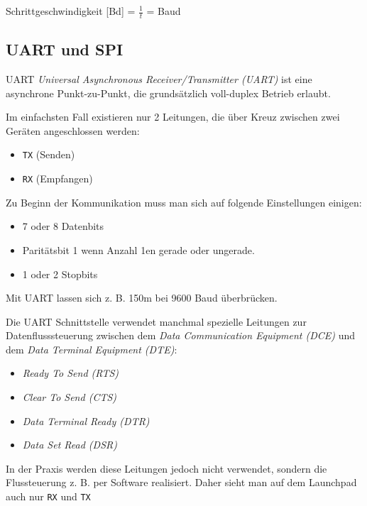 \begin{defi}{Schrittgeschwindigkeit}
    [Bd] = $\frac{1}{t}$ = Baud
\end{defi}

\subsection{UART und SPI}

\begin{defi}{UART}
    \emph{Universal Asynchronous Receiver/Transmitter (UART)} ist eine asynchrone Punkt-zu-Punkt, die grundsätzlich voll-duplex Betrieb erlaubt.

    Im einfachsten Fall existieren nur 2 Leitungen, die über Kreuz zwischen zwei Geräten angeschlossen werden:
    \begin{itemize}
        \item \texttt{TX} (Senden)
        \item \texttt{RX} (Empfangen)
    \end{itemize}

    Zu Beginn der Kommunikation muss man sich auf folgende Einstellungen einigen:
    \begin{itemize}
        \item 7 oder 8 Datenbits
        \item Paritätsbit 1 wenn Anzahl 1en gerade oder ungerade.
        \item 1 oder 2 Stopbits
    \end{itemize}

    Mit UART lassen sich z. B. 150m bei 9600 Baud überbrücken.

    Die UART Schnittstelle verwendet manchmal spezielle Leitungen zur Datenflusssteuerung zwischen dem \emph{Data Communication Equipment (DCE)} und dem \emph{Data Terminal Equipment (DTE)}:
    \begin{itemize}
        \item \emph{Ready To Send (RTS)}
        \item \emph{Clear To Send (CTS)}
        \item \emph{Data Terminal Ready (DTR)}
        \item \emph{Data Set Read (DSR)}
    \end{itemize}

    In der Praxis werden diese Leitungen jedoch nicht verwendet, sondern die Flussteuerung z. B. per Software realisiert.
    Daher sieht man auf dem Launchpad auch nur \texttt{RX} und \texttt{TX}
\end{defi}

